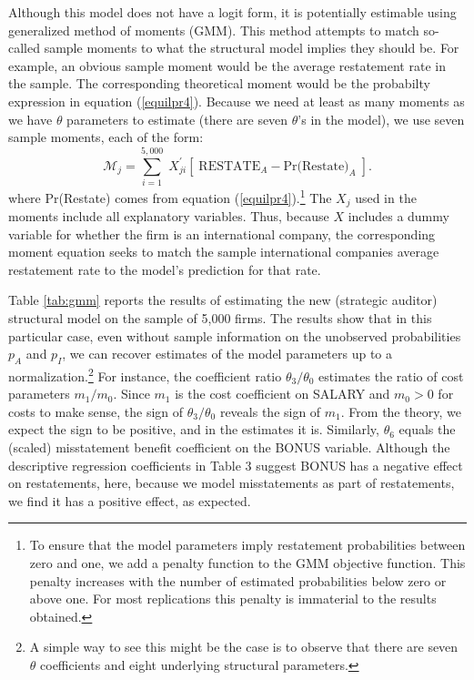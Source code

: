 Although this model does not have a logit form, it is potentially estimable using 
generalized method of moments (GMM).
This method attempts to match so-called sample moments to what the structural model implies they should be. 
For example, an obvious sample moment would be the average restatement rate in the sample.
The corresponding theoretical moment would be the probabilty expression in equation (\ref{equilpr4}).
Because we need at least as many moments as we have $\theta$ parameters to estimate (there are seven $\theta$'s in the model), we use seven sample moments, each of the form:
$$ \mathcal{M}_j = \sum_{i=1}^{5,000} \; X_{ji}^\prime\left[\; \mbox{RESTATE}_A - \mbox{Pr(Restate)}_A \; \right]. $$
where Pr(Restate) comes from equation (\ref{equilpr4}).\footnote{
To ensure that the model parameters imply restatement probabilities between zero and one, we add a penalty function to the GMM objective function.
This penalty increases with the number of estimated probabilities below zero or above one.
For most replications this penalty is immaterial to the results obtained.} 
The $X_j$ used in the moments include all explanatory variables. 
Thus, because $X$ includes  a dummy variable for whether the firm is an international company, the corresponding moment equation seeks to match the sample international companies average restatement rate to the model's prediction for that rate.

Table \ref{tab:gmm} reports the results of estimating the new (strategic auditor) structural model on the sample of 5,000 firms. 
The results show that in this particular case, even without sample information on the unobserved probabilities $p_A$ and $p_I$, we can recover estimates of the model parameters up to a normalization.\footnote{
A simple way to see this might be the case is to observe that there are seven $\theta$ coefficients and eight underlying structural parameters.}
For instance, the coefficient ratio $\theta_3/\theta_0$ estimates the ratio of cost parameters $m_1/m_0$.
Since $m_1$ is the cost coefficient on SALARY and $m_0>0$ for costs to make sense, the sign of $\theta_3/\theta_0$ reveals the sign of $m_1$.
From the theory, we expect the sign to be positive, and in the estimates it is. 
Similarly, $\theta_6$ equals the (scaled) misstatement benefit coefficient on the BONUS variable.
Although the descriptive regression coefficients in Table 3 suggest BONUS has a negative effect on restatements, here, because we model misstatements as part of restatements, we find it has a positive effect, as expected.

